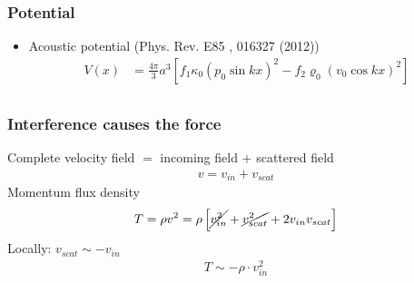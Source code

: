 \documentclass{beamer}
\begin{document}

\begin{frame}
\frametitle{Potential}
\begin{itemize}
\item Acoustic potential (Phys. Rev. E85 , 016327 (2012))
 \begin{align*}
V(x)&= \frac{4\pi}{3} a^3\left[f_1 \kappa_0 (p_0 \sin kx)^2 - f_2 \varrho_0 (v_0 \cos kx)^2 \right]\\
 \end{align*}
\end{itemize}
\end{frame}

\begin{frame}
\frametitle{Interference causes the force}
Complete velocity field $=$ incoming field $+$ scattered field
\begin{align*}
 v= v_{in} + v_{scat}    		
\end{align*}
Momentum flux density 
\begin{align*}
   T=\rho v^2 = \rho \left[ \cancel{v_{in}^2} + \cancel{v_{scat}^2} + 2 v_{in} v_{scat} \right]
\end{align*}
Locally: $ v_{scat} \sim -v_{in}$
\begin{align*}
T\sim - \rho \cdot v_{in}^2
\end{align*}
\begin{center}
\end{center}
\end{frame}
\end{document}
